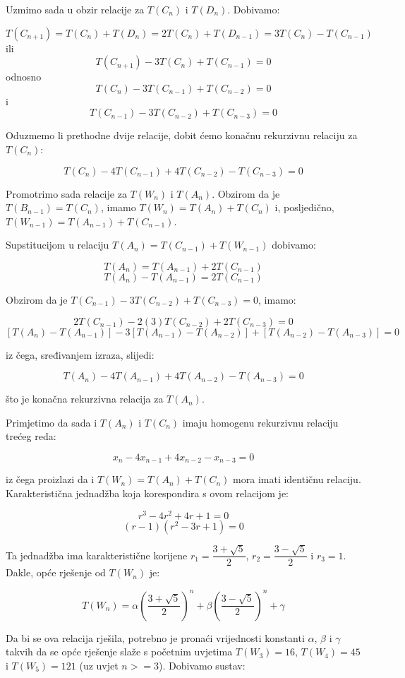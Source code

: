 \documentclass[times, utf8, zavrsni]{fer}
\begin{document}
Uzmimo sada u obzir relacije za $T(C_n)$ i $T(D_n)$. Dobivamo:

\[T(C_{n + 1}) = T(C_n) + T(D_n) = 2T(C_n) + T(D_{n - 1}) = 3T(C_n) - T(C_{n - 1})\]
ili 
\[T(C_{n + 1}) - 3T(C_n) + T(C_{n - 1}) = 0\]
odnosno
\[T(C_n) - 3T(C_{n - 1}) + T(C_{n - 2}) = 0\] i
\[T(C_{n-1}) - 3T(C_{n - 2}) + T(C_{n - 3}) = 0\]

Oduzmemo li prethodne dvije relacije, dobit ćemo konačnu rekurzivnu relaciju za $T(C_n)$:

\[T(C_n) - 4T(C_{n - 1}) + 4T(C_{n - 2}) - T(C_{n - 3}) = 0\]

Promotrimo sada relacije za $T(W_n)$ i $T(A_n)$. Obzirom da je $T(B_{n -1}) = T(C_n)$, imamo $T(W_n) = T(A_n) + T(C_n)$ i, posljedično, $T(W_{n - 1}) = T(A_{n - 1}) + T(C_{n - 1})$.

Supstitucijom u relaciju $T(A_n) = T(C_{n - 1}) + T(W_{n - 1})$ dobivamo:

\[T(A_n) = T(A_{n - 1}) + 2T(C_{n - 1})\]
\[T(A_n) - T(A_{n - 1}) = 2T(C_{n - 1})\]

Obzirom da je $T(C_{n - 1}) - 3T(C_{n - 2}) + T(C_{n - 3}) = 0$, imamo:

\[2T(C_{n - 1}) - 2(3)T(C_{n - 2}) + 2T(C_{n - 3}) = 0\]
\[[T(A_n) - T(A_{n - 1})] - 3[T(A_{n - 1}) - T(A_{n - 2})] + [T(A_{n - 2}) - T(A_{n - 3})] = 0\]

iz čega, sređivanjem izraza, slijedi:

\[T(A_n) - 4T(A_{n - 1}) + 4T(A_{n - 2}) - T(A_{n - 3}) = 0\]

što je konačna rekurzivna relacija za $T(A_n)$.

Primjetimo da sada i $T(A_n)$ i $T(C_n)$ imaju homogenu rekurzivnu relaciju trećeg reda:

\[x_n - 4x_{n - 1} + 4x_{n - 2} - x_{n - 3} = 0\]

iz čega proizlazi da i $T(W_n) = T(A_n) + T(C_n)$ mora imati identičnu relaciju. Karakteristična jednadžba koja korespondira s ovom relacijom je:

\[r^3 - 4r^2 + 4r + 1 = 0\]
\[(r - 1)(r^2 - 3r + 1) = 0\]

Ta jednadžba ima karakteristične korijene $r_1 = \dfrac{3 + \sqrt{5}}{2}$, $r_2 = \dfrac{3 - \sqrt{5}}{2}$ i $r_3 = 1$. Dakle, opće rješenje od $T(W_n)$ je:

\[T(W_n) = \alpha(\dfrac{3 + \sqrt{5}}{2})^n + \beta(\dfrac{3 - \sqrt{5}}{2})^n + \gamma\]

Da bi se ova relacija rješila, potrebno je pronaći vrijednosti konstanti $\alpha$, $\beta$ i $\gamma$ takvih da se opće rješenje slaže s početnim uvjetima $T(W_3) = 16$, $T(W_4) = 45$ i $T(W_5) = 121$ (uz uvjet $n >= 3$). Dobivamo sustav:
\end{document}
